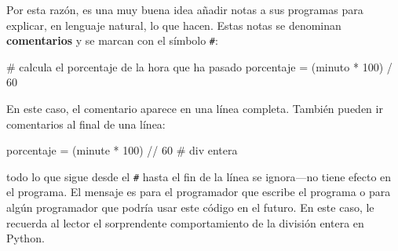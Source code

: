 Por esta razón, es una muy buena idea añadir notas a sus programas
para explicar, en lenguaje natural, lo que hacen. Estas notas se denominan
\textbf{comentarios }y se marcan con el símbolo \texttt{\#}:

\begin{pythoncode}
# calcula el porcentaje de la hora que ha pasado
porcentaje = (minuto * 100) / 60
\end{pythoncode}
 En este caso, el comentario aparece en una línea completa. También
pueden ir comentarios al final de una línea:

\begin{pythoncode}
porcentaje = (minute * 100) // 60 # div entera
\end{pythoncode}

todo lo que sigue desde el \texttt{\#} hasta el fin de la línea se
ignora—no tiene efecto en el programa. El mensaje es para el programador
que escribe el programa o para algún programador que podría usar este
código en el futuro. En este caso, le recuerda al lector el sorprendente
comportamiento de la división entera en Python.


